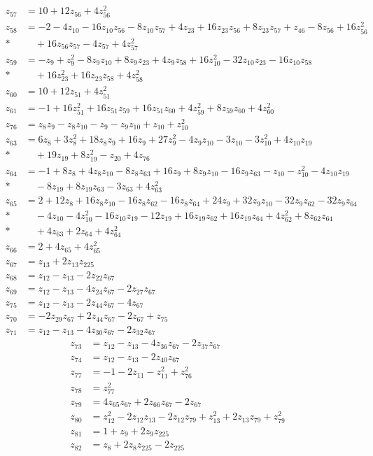 \begin{align*}
z_{57}&=10+12z_{56}+4z_{56}^{2}\\[3pt]
z_{58}&=-2-4z_{10}-16z_{10} z_{56}-8z_{10} z_{57}+4z_{23}+16z_{23} z_{56}+8z_{23} z_{57}+z_{46}-8z_{56}+16z_{56}^{2}\\*
&\quad{}+16z_{56} z_{57}-4z_{57}+4z_{57}^{2}\\[3pt]
z_{59}&=-z_{9}+z_{9}^{2}-8z_{9} z_{10}+8z_{9} z_{23}+4z_{9} z_{58}+16z_{10}^{2}-32z_{10} z_{23}-16z_{10} z_{58}\\*
&\quad{}+16z_{23}^{2}+16z_{23} z_{58}+4z_{58}^{2}\\[3pt]
z_{60}&=10+12z_{51}+4z_{51}^{2}\\[3pt]
z_{61}&=-1+16z_{51}^{2}+16z_{51} z_{59}+16z_{51} z_{60}+4z_{59}^{2}+8z_{59} z_{60}+4z_{60}^{2}\\[3pt]
z_{76}&=z_{8} z_{9}-z_{8} z_{10}-z_{9}-z_{9} z_{10}+z_{10}+z_{10}^{2}\\[3pt]
z_{63}&=6z_{8}+3z_{8}^{2}+18z_{8} z_{9}+16z_{9}+27z_{9}^{2}-4z_{9} z_{10}-3z_{10}-3z_{10}^{2}+4z_{10} z_{19}\\*
&\quad{}+19z_{19}+8z_{19}^{2}-z_{20}+4z_{76}\\[3pt]
z_{64}&=-1+8z_{8}+4z_{8} z_{10}-8z_{8} z_{63}+16z_{9}+8z_{9} z_{10}-16z_{9} z_{63}-z_{10}-z_{10}^{2}-4z_{10} z_{19}\\*
&\quad{}-8z_{19}+8z_{19} z_{63}-3z_{63}+4z_{63}^{2}
\end{align*}
\begin{align*}
z_{65}&=2+12z_{8}+16z_{8} z_{10}-16z_{8} z_{62}-16z_{8} z_{64}+24z_{9}+32z_{9} z_{10}-32z_{9} z_{62}-32z_{9} z_{64}\\*
&\quad{}-4z_{10}-4z_{10}^{2}-16z_{10} z_{19}-12z_{19}+16z_{19} z_{62}+16z_{19} z_{64}+4z_{62}^{2}+8z_{62} z_{64}\\*
&\quad{}+4z_{63}+2z_{64}+4z_{64}^{2}\\[3pt]
z_{66}&=2+4z_{65}+4z_{65}^{2}\\[3pt]
z_{67}&=z_{13}+2z_{13} z_{225}\\[3pt]
z_{68}&=z_{12}-z_{13}-2z_{22} z_{67}\\[3pt]
z_{69}&=z_{12}-z_{13}-4z_{24} z_{67}-2z_{27} z_{67}\\[3pt]
z_{75}&=z_{12}-z_{13}-2z_{44} z_{67}-4z_{67}\\[3pt]
z_{70}&=-2z_{29} z_{67}+2z_{44} z_{67}-2z_{67}+z_{75}\\[3pt]
z_{71}&=z_{12}-z_{13}-4z_{30} z_{67}-2z_{32} z_{67}
\end{align*}
\begin{align*}
z_{73}&=z_{12}-z_{13}-4z_{36} z_{67}-2z_{37} z_{67}\\[3pt]
z_{74}&=z_{12}-z_{13}-2z_{40} z_{67}\\[3pt]
z_{77}&=-1-2z_{11}-z_{11}^{2}+z_{76}^{2}\\[3pt]
z_{78}&=z_{77}^{2}\\[3pt]
z_{79}&=4z_{65} z_{67}+2z_{66} z_{67}-2z_{67}\\[3pt]
z_{80}&=z_{12}^{2}-2z_{12} z_{13}-2z_{12} z_{79}+z_{13}^{2}+2z_{13} z_{79}+z_{79}^{2}\\[3pt]
z_{81}&=1+z_{9}+2z_{9} z_{225}\\[3pt]
z_{82}&=z_{8}+2z_{8} z_{225}-2z_{225}
\end{align*}
